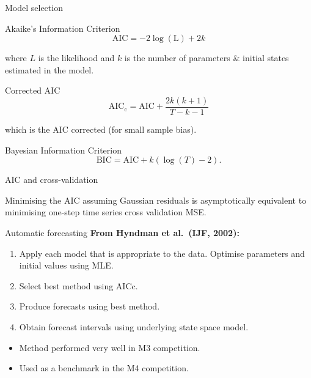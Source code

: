 \documentclass[
  14pt,
  ignorenonframetext,
  aspectratio=169,
]{beamer}
\providecommand{\tightlist}{%
  \setlength{\itemsep}{0pt}\setlength{\parskip}{0pt}}
\begin{document}
\begin{frame}{Model selection}
\protect{}\label{model-selection}
\fontsize{13}{15}\sf

\begin{block}{Akaike's Information Criterion}
\[
\text{AIC} = -2\log(\text{L}) + 2k
\]
\end{block}\vspace*{-0.2cm}

where \(L\) is the likelihood and \(k\) is the number of parameters \&
initial states estimated in the model.\pause

\begin{block}{Corrected AIC}
\[
\text{AIC}_{\text{c}} = \text{AIC} + \frac{2k(k+1)}{T-k-1}
\]
\end{block}\vspace*{-0.4cm}

which is the AIC corrected (for small sample bias). \pause

\begin{block}{Bayesian Information Criterion}
\[
\text{BIC} = \text{AIC} + k(\log(T)-2).
\]
\end{block}
\end{frame}

\begin{frame}{AIC and cross-validation}
\protect{}\label{aic-and-cross-validation}
\Large

\begin{alertblock}{}
Minimising the AIC assuming Gaussian residuals is asymptotically equivalent to minimising one-step time series cross validation MSE.
\end{alertblock}
\end{frame}

\begin{frame}{Automatic forecasting}
\protect{}\label{automatic-forecasting}
\textbf{From Hyndman et al.~(IJF, 2002):}

\begin{enumerate}
\tightlist
\item
  Apply each model that is appropriate to the data. Optimise parameters
  and initial values using MLE.
\item
  Select best method using AICc.
\item
  Produce forecasts using best method.
\item
  Obtain forecast intervals using underlying state space model.
\end{enumerate}

\begin{itemize}
\tightlist
\item
  Method performed very well in M3 competition.
\item
  Used as a benchmark in the M4 competition.
\end{itemize}
\end{frame}
\end{document}
